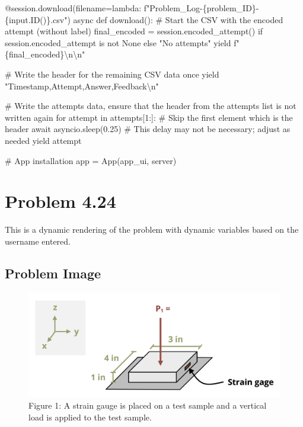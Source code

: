 \documentclass[
  letterpaper,
  DIV=11,
  numbers=noendperiod]{scrreprt}
\newenvironment{Shaded}{\begin{snugshade}}{\end{snugshade}}
\newcommand{\NormalTok}[1]{\textcolor[rgb]{0.00,0.23,0.31}{#1}}
\begin{document}
\begin{Shaded}
\begin{Highlighting}[]
\NormalTok{    @session.download(filename=lambda: f"Problem\_Log{-}\{problem\_ID\}{-}\{input.ID()\}.csv")}
\NormalTok{    async def download():}
\NormalTok{        \# Start the CSV with the encoded attempt (without label)}
\NormalTok{        final\_encoded = session.encoded\_attempt() if session.encoded\_attempt is not None else "No attempts"}
\NormalTok{        yield f"\{final\_encoded\}\textbackslash{}n\textbackslash{}n"}
        
\NormalTok{        \# Write the header for the remaining CSV data once}
\NormalTok{        yield "Timestamp,Attempt,Answer,Feedback\textbackslash{}n"}
        
\NormalTok{        \# Write the attempts data, ensure that the header from the attempts list is not written again}
\NormalTok{        for attempt in attempts[1:]:  \# Skip the first element which is the header}
\NormalTok{            await asyncio.sleep(0.25)  \# This delay may not be necessary; adjust as needed}
\NormalTok{            yield attempt}


\NormalTok{\# App installation}
\NormalTok{app = App(app\_ui, server)}
\end{Highlighting}
\end{Shaded}

\chapter*{Problem 4.24}\label{problem-4.24}


This is a dynamic rendering of the problem with dynamic variables based
on the username entered.

\section*{Problem Image}\label{problem-image-38}


\begin{figure}[H]

{\centering \includegraphics{images/205.png}

}

\caption{Figure 1: A strain gauge is placed on a test sample and a
vertical load is applied to the test sample.}

\end{figure}%
\end{document}
